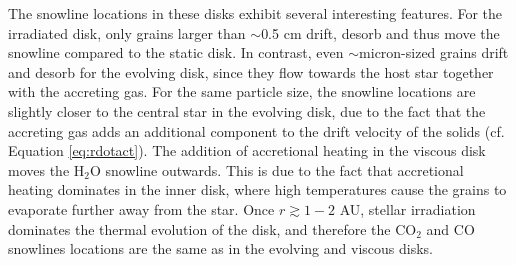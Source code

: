 \documentclass[apj]{emulateapj}
\begin{document}


The snowline locations in these disks exhibit several interesting features. For the irradiated disk, only grains larger than $\sim$0.5 cm drift, desorb and thus move the snowline compared to the static disk. In contrast, even $\sim$micron-sized grains drift and desorb for the evolving disk, since they flow towards the host star together with the accreting gas. For the same particle size, the snowline locations are slightly closer to the central star in the evolving disk, due to the fact that the accreting gas adds an additional component to the drift velocity of the solids (cf. Equation \ref{eq:rdotact}). The addition of accretional heating in the viscous disk moves the H$_2$O snowline outwards. This is due to the fact that accretional heating dominates in the inner disk, where high temperatures cause the grains to evaporate further away from the star. Once $r\gtrsim1-2$  AU, stellar irradiation dominates the thermal evolution of the disk, and therefore the CO$_2$ and CO snowlines locations are the same as in the evolving and viscous disks. 
\end{document}
